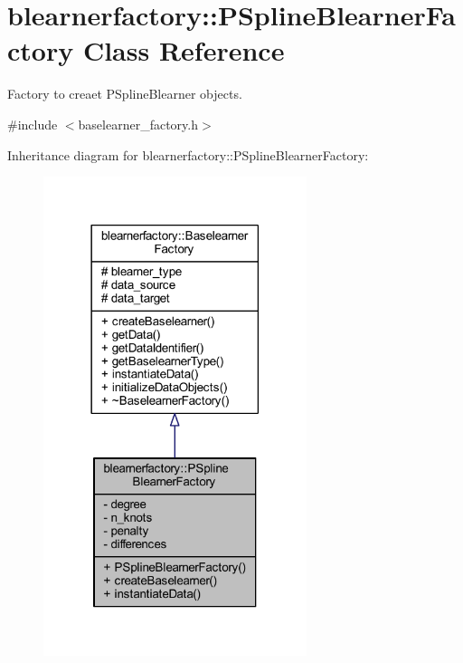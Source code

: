 \hypertarget{classblearnerfactory_1_1_p_spline_blearner_factory}{}\section{blearnerfactory\+:\+:P\+Spline\+Blearner\+Factory Class Reference}
\label{classblearnerfactory_1_1_p_spline_blearner_factory}


Factory to creaet {\ttfamily P\+Spline\+Blearner} objects.  




{\ttfamily \#include $<$baselearner\+\_\+factory.\+h$>$}



Inheritance diagram for blearnerfactory\+:\+:P\+Spline\+Blearner\+Factory\+:\nopagebreak
\begin{figure}[H]
\begin{center}
\leavevmode
\includegraphics[width=218pt]{classblearnerfactory_1_1_p_spline_blearner_factory__inherit__graph}
\end{center}
\end{figure}



